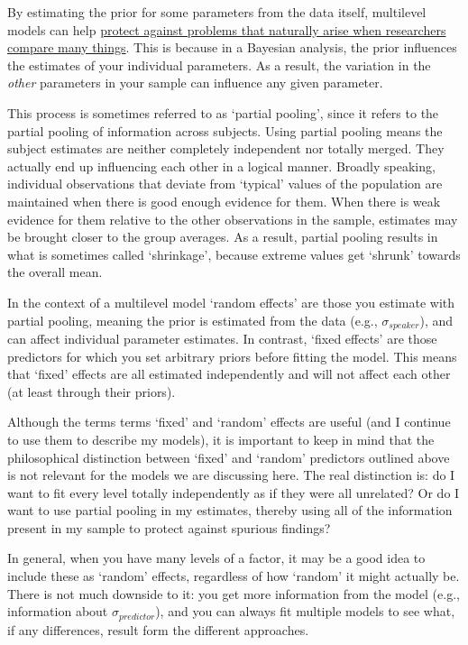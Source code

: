 \documentclass[
]{book}
\begin{document}
By estimating the prior for some parameters from the data itself, multilevel models can help \href{http://www.stat.columbia.edu/~gelman/research/published/multiple2f.pdf}{protect against problems that naturally arise when researchers compare many things}. This is because in a Bayesian analysis, the prior influences the estimates of your individual parameters. As a result, the variation in the \emph{other} parameters in your sample can influence any given parameter.

This process is sometimes referred to as `partial pooling', since it refers to the partial pooling of information across subjects. Using partial pooling means the subject estimates are neither completely independent nor totally merged. They actually end up influencing each other in a logical manner. Broadly speaking, individual observations that deviate from `typical' values of the population are maintained when there is good enough evidence for them. When there is weak evidence for them relative to the other observations in the sample, estimates may be brought closer to the group averages. As a result, partial pooling results in what is sometimes called `shrinkage', because extreme values get `shrunk' towards the overall mean.

In the context of a multilevel model `random effects' are those you estimate with partial pooling, meaning the prior is estimated from the data (e.g., \(\sigma_{speaker}\)), and can affect individual parameter estimates. In contrast, `fixed effects' are those predictors for which you set arbitrary priors before fitting the model. This means that `fixed' effects are all estimated independently and will not affect each other (at least through their priors).

Although the terms terms `fixed' and `random' effects are useful (and I continue to use them to describe my models), it is important to keep in mind that the philosophical distinction between `fixed' and `random' predictors outlined above is not relevant for the models we are discussing here. The real distinction is: do I want to fit every level totally independently as if they were all unrelated? Or do I want to use partial pooling in my estimates, thereby using all of the information present in my sample to protect against spurious findings?

In general, when you have many levels of a factor, it may be a good idea to include these as `random' effects, regardless of how `random' it might actually be. There is not much downside to it: you get more information from the model (e.g., information about \(\sigma_{predictor}\)), and you can always fit multiple models to see what, if any differences, result form the different approaches.
\end{document}
